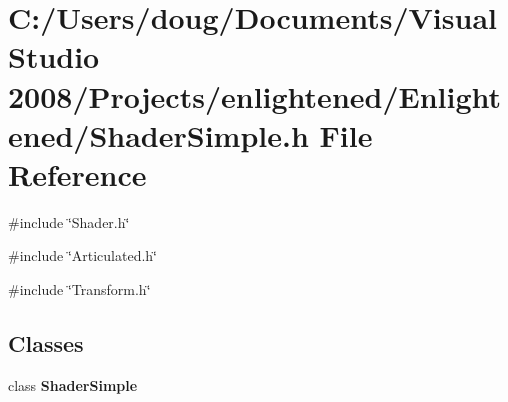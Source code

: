 \section{C:/Users/doug/Documents/Visual Studio 2008/Projects/enlightened/Enlightened/ShaderSimple.h File Reference}
\label{_shader_simple_8h}
{\ttfamily \#include \char`\"{}Shader.h\char`\"{}}\par
{\ttfamily \#include \char`\"{}Articulated.h\char`\"{}}\par
{\ttfamily \#include \char`\"{}Transform.h\char`\"{}}\par
\subsection*{Classes}
\begin{DoxyCompactItemize}
\item 
class {\bf ShaderSimple}
\end{DoxyCompactItemize}
